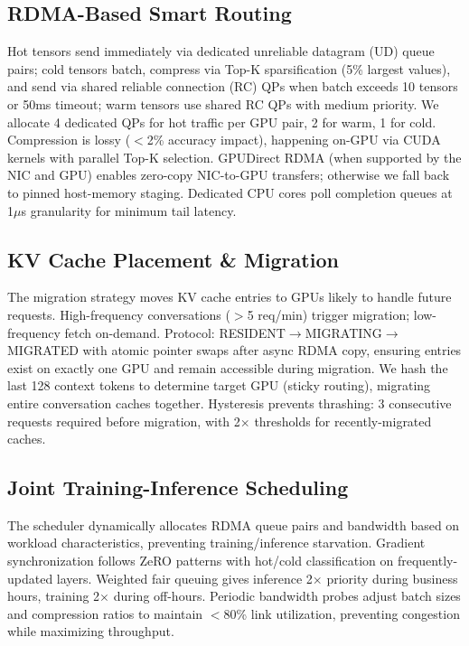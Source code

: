 \documentclass[10pt,letterpaper]{article}
\begin{document}
\subsection{RDMA-Based Smart Routing}
Hot tensors send immediately via dedicated unreliable datagram (UD) queue pairs; cold tensors batch, compress via Top-K sparsification (5\% largest values), and send via shared reliable connection (RC) QPs when batch exceeds 10 tensors or 50ms timeout; warm tensors use shared RC QPs with medium priority. We allocate 4 dedicated QPs for hot traffic per GPU pair, 2 for warm, 1 for cold. Compression is lossy ($<$2\% accuracy impact), happening on-GPU via CUDA kernels with parallel Top-K selection. GPUDirect RDMA (when supported by the NIC and GPU) enables zero-copy NIC-to-GPU transfers; otherwise we fall back to pinned host-memory staging. Dedicated CPU cores poll completion queues at 1$\mu$s granularity for minimum tail latency.

\subsection{KV Cache Placement \& Migration}
The migration strategy moves KV cache entries to GPUs likely to handle future requests. High-frequency conversations ($>$5 req/min) trigger migration; low-frequency fetch on-demand. Protocol: RESIDENT$\rightarrow$MIGRATING$\rightarrow$MIGRATED with atomic pointer swaps after async RDMA copy, ensuring entries exist on exactly one GPU and remain accessible during migration. We hash the last 128 context tokens to determine target GPU (sticky routing), migrating entire conversation caches together. Hysteresis prevents thrashing: 3 consecutive requests required before migration, with 2$\times$ thresholds for recently-migrated caches.

\subsection{Joint Training-Inference Scheduling}
The scheduler dynamically allocates RDMA queue pairs and bandwidth based on workload characteristics, preventing training/inference starvation. Gradient synchronization follows ZeRO patterns with hot/cold classification on frequently-updated layers. Weighted fair queuing gives inference 2$\times$ priority during business hours, training 2$\times$ during off-hours. Periodic bandwidth probes adjust batch sizes and compression ratios to maintain $<$80\% link utilization, preventing congestion while maximizing throughput.
\end{document}
